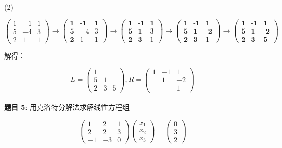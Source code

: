\documentclass{article}
\begin{document}
\noindent (2)

$$
\begin{pmatrix}
    1 & -1 & 1 \\
    5 & -4 & 3 \\
    2 & 1 & 1
\end{pmatrix}
\longrightarrow
\begin{pmatrix}
    \textbf{1} & \textbf{-1} & \textbf{1} \\
    \textbf{5} & -4 & 3 \\
    \textbf{2} & 1 & 1
\end{pmatrix}
\longrightarrow
\begin{pmatrix}
    \textbf{1} & \textbf{-1} & \textbf{1} \\
    \textbf{5} & \textbf{1} & 3 \\
    \textbf{2} & \textbf{3} & 1
\end{pmatrix}
\longrightarrow
\begin{pmatrix}
    \textbf{1} & \textbf{-1} & \textbf{1} \\
    \textbf{5} & \textbf{1} & \textbf{-2} \\
    \textbf{2} & \textbf{3} & 1
\end{pmatrix}
\longrightarrow
\begin{pmatrix}
    \textbf{1} & \textbf{-1} & \textbf{1} \\
    \textbf{5} & \textbf{1} & \textbf{-2} \\
    \textbf{2} & \textbf{3} & \textbf{5}
\end{pmatrix}
$$

解得：

$$
L = 
\begin{pmatrix}
    1 &   &   \\
    5 & 1 &   \\
    2 & 3 & 5
\end{pmatrix}, 
R = 
\begin{pmatrix}
    1 & -1 & 1 \\
      & 1 & -2 \\
      &   & 1
\end{pmatrix}
$$ \\


\noindent\textbf{题目 5}: 用克洛特分解法求解线性方程组

$$
\begin{pmatrix}
    1 & 2 & 1 \\
    2 & 2 & 3 \\
    -1 & -3 & 0
\end{pmatrix}
\begin{pmatrix}
    x_1 \\
    x_2 \\
    x_3
\end{pmatrix}
=
\begin{pmatrix}
    0 \\
    3 \\
    2
\end{pmatrix}
$$
\end{document}
